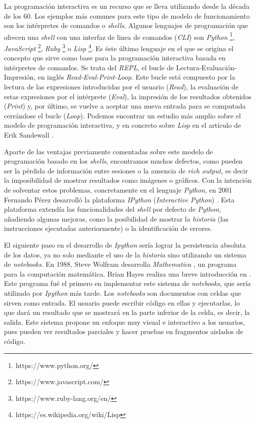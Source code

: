 \documentclass[11pt,spanish,listoffigures]{tfgetsinf}
\begin{document}
La programación interactiva es un recurso que se lleva utilizando desde la década de los 60. Los ejemplos más comunes para este tipo de modelo de funcionamiento son los intérpretes de comandos o \textit{shells}. Algunos lenguajes de programación que ofrecen una \textit{shell} con una interfaz de linea de comandos (\textit{CLI}) son \textit{Python} \footnote{https://www.python.org/}, \textit{JavaScript} \footnote{https://www.javascript.com/}, \textit{Ruby} \footnote{https://www.ruby-lang.org/en/} o \textit{Lisp} \footnote{https://es.wikipedia.org/wiki/Lisp}. Es éste último lenguaje en el que se origina el concepto que sirve como base para la programación interactiva basada en intérpretes de comandos. Se trata del \textit{REPL}, el bucle de Lectura-Evaluación-Impresión, en inglés \textit{Read-Eval-Print-Loop}. Este bucle está compuesto por la lectura de las expresiones introducidas por el usuario (\textit{Read}), la evaluación de estas expresiones por el intérprete (\textit{Eval}), la impresión de los resultados obtenidos (\textit{Print}) y, por último, se vuelve a aceptar una nueva entrada para se computada cerrándose el bucle (\textit{Loop}). Podemos encontrar un estudio más amplio sobre el modelo de programación interactiva, y en concreto sobre \textit{Lisp} en el artículo de Erik Sandewall \cite{Sandewall}.

Aparte de las ventajas previamente comentadas sobre este modelo de programación basado en los \textit{shells}, encontramos muchos defectos, como pueden ser la pérdida de información entre sesiones o la ausencia de \textit{rich output}, es decir la imposibilidad de mostrar resultados como imágenes o gráficos. Con la intención de solventar estos problemas, concretamente en el lenguaje \textit{Python}, en 2001 Fernando Pérez desarrolló la plataforma \textit{IPython} (\textit{Interactive Python}) \cite{ipython}. Esta plataforma extendía las funcionalidades del \textit{shell} por defecto de \textit{Python}, añadiendo algunas mejoras, como la posibilidad de mostrar la \textit{historia} (las instrucciones ejecutadas anteriormente) o la identificación de errores.

El siguiente paso en el desarrollo de \textit{Ipython} sería lograr la persistencia absoluta de los datos, ya no solo mediante el uso de la \textit{historia} sino utilizando un sistema de \textit{notebooks}. En 1988, Steve Wolfram desarrolla \textit{Mathematica} \cite{math}, un programa para la computación matemática. Brian Hayes realiza una breve introducción en \cite{th-mathematica}. Este programa fué el primero en implementar este sistema de \textit{notebooks}, que sería utilizado por \textit{Ipython} más tarde. Los \textit{notebooks} son documentos con celdas que sirven como entrada. El usuario puede escribir código en ellas y ejecutarlas, lo que dará un resultado que se mostrará en la parte inferior de la celda, es decir, la salida. Este sistema propone un enfoque muy visual e interactivo a los usuarios, pues pueden ver resultados parciales y hacer pruebas en fragmentos aislados de código.
\end{document}
